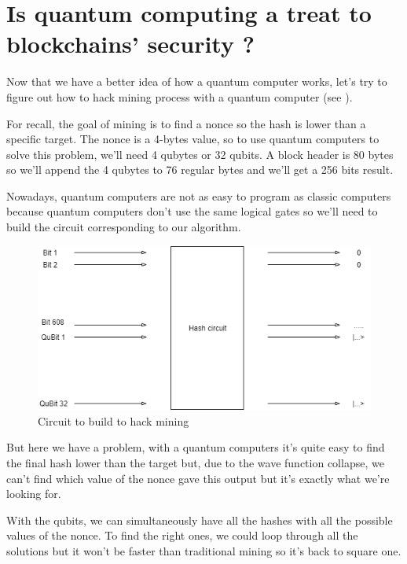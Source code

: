\section{Is quantum computing a treat to blockchains' security ?}

Now that we have a better idea of how a quantum computer works, let's try to figure out how to hack mining process with a quantum computer (see \cite{quantum_computer}). \newline

For recall, the goal of mining is to find a nonce so the hash is lower than a specific target. The nonce is a 4-bytes value, so to use quantum computers to solve this problem, we'll need 4 qubytes or 32 qubits. A block header is 80 bytes so we'll append the 4 qubytes to 76 regular bytes and we'll get a 256 bits result.\newline

Nowadays, quantum computers are not as easy to program as classic computers because quantum computers don't use the same logical gates so we'll need to build the circuit corresponding to our algorithm.

\clearpage

\begin{figure}[ht]
\centering
\includegraphics[width=12cm]{Figures/hashCircuit}
\caption{Circuit to build to hack mining}
\end{figure}
\medskip

But here we have a problem, with a quantum computers it's quite easy to find the final hash lower than the target but, due to the wave function collapse, we can't find which value of the nonce gave this output but it's exactly what we're looking for. \newline

With the qubits, we can simultaneously have all the hashes with all the possible values of the nonce. To find the right ones, we could loop through all the solutions but it won't be faster than traditional mining so it's back to square one.

